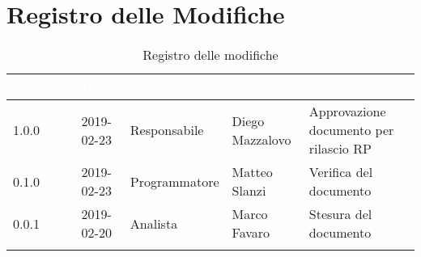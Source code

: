 \newpage

\section*{Registro delle Modifiche}

\begin{center}
\begin{longtable}[c]{|m{}|m{}|m{}|m{}|p{}|}
\hline
\rowcolor{bluelogo}\textbf{\textcolor{white}{Versione}} & \textbf{\textcolor{white}{Data}} & \textbf{\textcolor{white}{Ruolo}} & \textbf{\textcolor{white}{Autore}} & \textbf{\textcolor{white}{Descrizione}}\\
\hline 
\endfirsthead
1.0.0 & 2019-02-23 & Responsabile & Diego Mazzalovo & Approvazione documento per rilascio RP\\
\hline
\rowcolor{grigio} 0.1.0 & 2019-02-23 & Programmatore & Matteo Slanzi & Verifica del documento \\
\hline
0.0.1 & 2019-02-20 & Analista & Marco Favaro & Stesura del documento \\
\hline
\caption{Registro delle modifiche}
\end{longtable}
\end{center}

